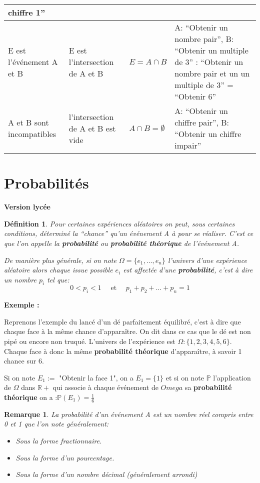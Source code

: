 \documentclass[a4paper]{report}
\theoremstyle{break}
\newtheorem{mydef}{Définition}[chapter]
\newtheorem*{Rem}{Remarque}
\newcommand{\R}{\mathbb{R}}
\newcounter{exem}
\newcommand{\exemple}[1]{\textbf{Exemple \theexem: #1} \addtocounter{exem}{1} }
\begin{document}
\begin{table}[h!]
\begin{tabular}{|L{5cm}|L{5cm}|L{1.5cm}|L{5cm}|}
                                    chiffre 1'' \\
  \hline
  E est l'événement A et B & E est l'intersection de A et B & $E = A \cap B$
                           &  A: ``Obtenir un nombre pair'', B: ``Obtenir un multiple de 3''
                             \color{red}{E}: ``Obtenir un nombre pair et un
                             un multiple de 3'' = ``Obtenir 6'' \\
  \hline
  A et B sont incompatibles & l'intersection de A et B est vide & $A \cap B =
                                                                  \emptyset$
                            & A: ``Obtenir un chiffre pair'', B: ``Obtenir un
                              chiffre impair''\\
  \hline
\end{tabular}
\end{table}

\section{Probabilités}
\textbf{Version lycée}
\begin{mydef}
  Pour certaines expériences aléatoires on peut, sous certaines conditions,
  déterminé la ``chance'' qu'un événement A à pour se réaliser. C'est ce que l'on
  appelle la \textbf{probabilité} ou \textbf{probabilité théorique} de
  l'événement A.

  De manière plus générale, si on note $\Omega = \{e_1, \dots, e_n\}$ l'univers
  d'une expérience aléatoire alors chaque issue possible $e_i$ est affectée
  d'une \textbf{probabilité}, c'est à dire un nombre $p_i$ tel que:
  \[
    0 < p_i < 1 \quad \text{ et } \quad p_1 + p_2 + \dots + p_n = 1
  \]
\end{mydef}

\exemple{}

Reprenons l'exemple du lancé d'un dé parfaitement équilibré, c'est à dire que
chaque face à la même chance d'apparaître. On dit dans ce cas que le dé est non
pipé ou encore non truqué. L'univers de l'expérience est $\Omega: \{1, 2, 3, 4,
5, 6\}$. Chaque face à donc la même \textbf{probabilité théorique}
d'apparaître, à savoir 1 chance sur 6.

Si on note $E_1 :=$ "Obtenir la face 1", on a $E_1=\{1\}$ et si on note
$\mathbb{P}$ l'application de $\Omega$ dans $\R+$ qui associe à chaque événement
de $Omega$ sa \textbf{probabilité théorique} on a :$\mathbb{P}(E_1) =
\frac{1}{6} $

\begin{Rem}
  La probabilité d'un événement A est un nombre réel compris entre 0 et 1 que
  l'on note généralement:
  \begin{itemize}
  \item Sous la forme fractionnaire.
  \item Sous la forme d'un pourcentage.
  \item Sous la forme d'un nombre décimal (généralement arrondi)
  \end{itemize}
\end{Rem}
\end{document}
